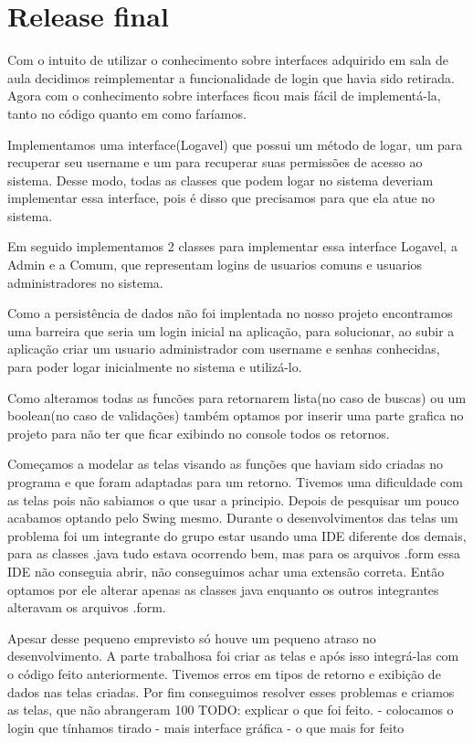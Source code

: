 \documentclass[11pt,twoside]{article}
\begin{document}
\section{Release final}
{\color{red}
Com o intuito de utilizar o conhecimento sobre interfaces adquirido em sala de aula decidimos reimplementar a funcionalidade de login que havia sido retirada. Agora com o conhecimento sobre interfaces ficou mais fácil de implementá-la, tanto no código quanto em como faríamos.

Implementamos uma interface(Logavel) que possui um método de logar, um para recuperar seu username e um para recuperar suas permissões de acesso ao sistema. Desse modo, todas as classes que podem logar no sistema deveriam implementar essa interface, pois é disso que precisamos para que ela atue no sistema.

Em seguido implementamos 2 classes para implementar essa interface Logavel, a Admin e a Comum, que representam logins de usuarios comuns e usuarios administradores no sistema.

Como a persistência de dados não foi implentada no nosso projeto encontramos uma barreira que seria um login inicial na aplicação, para solucionar, ao subir a aplicação criar um usuario administrador com username e senhas conhecidas, para poder logar inicialmente no sistema e utilizá-lo.

Como alteramos todas as funcões para retornarem lista(no caso de buscas) ou um boolean(no caso de validações) também optamos por inserir uma parte grafica no projeto para não ter que ficar exibindo no console todos os retornos. 

Começamos a modelar as telas visando as funções que haviam sido criadas no programa e que foram adaptadas para um retorno. Tivemos uma dificuldade com as telas pois não sabiamos o que usar a principio. Depois de pesquisar um pouco acabamos optando pelo Swing mesmo. Durante o desenvolvimentos das telas um problema foi um integrante do grupo estar usando uma IDE diferente dos demais, para as classes .java tudo estava ocorrendo bem, mas para os arquivos .form essa IDE não conseguia abrir, não conseguimos achar uma extensão correta. Então optamos por ele alterar apenas as classes java enquanto os outros integrantes alteravam os arquivos .form.

Apesar desse pequeno emprevisto só houve um pequeno atraso no desenvolvimento. A parte trabalhosa foi criar as telas e após isso integrá-las com o código feito anteriormente. Tivemos erros em tipos de retorno e exibição de dados nas telas criadas. Por fim conseguimos resolver esses problemas e criamos as telas, que não abrangeram 100%
TODO: explicar o que foi feito.
- colocamos o login que tínhamos tirado
- mais interface gráfica
- o que mais for feito
}
\end{document}
